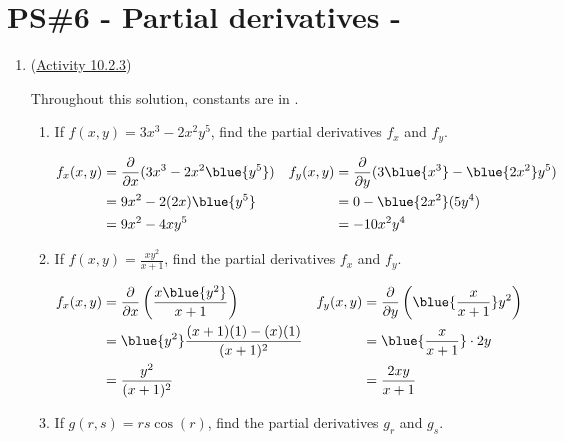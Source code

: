 



%


\allowdisplaybreaks
\section{PS\#6 - Partial derivatives -  }

\begin{enumerate}[leftmargin=0pt]
\item (\href{https://activecalculus.org/multi/S-10-2-First-Order-Partial-Derivatives.html#A_10_2_2}{Activity 10.2.3}) \begin{red}
    Throughout this solution, constants are in .
\end{red}
\begin{enumerate}
    \item If $f(x,y) = 3x^3 - 2x^2y^5$, find the partial derivatives $f_x$ and $f_y$.
    \begin{red}
        \begin{align*}
            f_x(x,y) &= \frac{\partial}{\partial x} (3x^3 - 2x^2\blue{y^5} ) &
            f_y(x,y) &= \frac{\partial}{\partial y} (3\blue{x^3} - \blue{2x^2}y^5) \\
            &= 9x^2 - 2(2x)\blue{y^5} &
            &= 0 - \blue{2x^2} (5y^4) \\
            &= 9x^2 - 4xy^5 &
            &= -10x^2 y^4
        \end{align*}
    \end{red}
    \item If $f(x,y) = \displaystyle\frac{xy^2}{x+1}$, find the partial derivatives $f_x$ and $f_y$.
    \begin{red}
        \begin{align*}
            f_x(x,y) &= \frac{\partial}{\partial x} \left( \frac{x\blue{y^2}}{x+1} \right) &
            f_y(x,y) &= \frac{\partial}{\partial y}\left( \blue{\frac{x}{x+1}} y^2 \right) \\
            &= \blue{y^2}\frac{(x+1)(1) - (x)(1)}{(x+1)^2} &
            &= \blue{\frac{x}{x+1}} \cdot 2y \\
            &= \frac{y^2}{(x+1)^2} &
            &= \frac{2xy}{x+1}
        \end{align*}
    \end{red}
    \item If $g(r,s) = rs\cos(r)$, find the partial derivatives $g_r$ and $g_s$.

\end{enumerate}
\end{enumerate}
